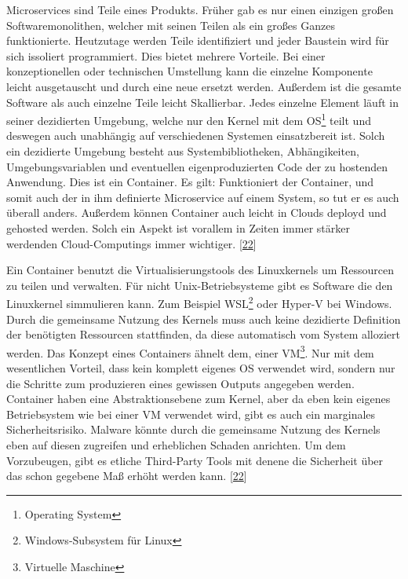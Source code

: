 \documentclass[
    headings=optiontotocandhead,%
    twoside,
    numbers=noenddot,%
    12pt, %
    titlepage, %
    parskip=full, %
    listof=leveldown, 
    numbers=noenddot, %
    a4paper,DIV=14,
    BCOR=15mm,
]{scrbook}
\begin{document}
Microservices sind Teile eines Produkts. Früher gab es nur einen
einzigen großen Softwaremonolithen, welcher mit seinen Teilen als ein
großes Ganzes funktionierte. Heutzutage werden Teile identifiziert und
jeder Baustein wird für sich issoliert programmiert. Dies bietet mehrere
Vorteile. Bei einer konzeptionellen oder technischen Umstellung kann die
einzelne Komponente leicht ausgetauscht und durch eine neue ersetzt
werden. Außerdem ist die gesamte Software als auch einzelne Teile leicht
Skallierbar. Jedes einzelne Element läuft in seiner dezidierten
Umgebung, welche nur den Kernel mit dem OS\footnote{Operating System}
teilt und deswegen auch unabhängig auf verschiedenen Systemen
einsatzbereit ist. Solch ein dezidierte Umgebung besteht aus
Systembibliotheken, Abhängikeiten, Umgebungsvariablen und eventuellen
eigenproduzierten Code der zu hostenden Anwendung. Dies ist ein
Container. Es gilt: Funktioniert der Container, und somit auch der in
ihm definierte Microservice auf einem System, so tut er es auch überall
anders. Außerdem können Container auch leicht in Clouds deployd und
gehosted werden. Solch ein Aspekt ist vorallem in Zeiten immer stärker
werdenden Cloud-Computings immer wichtiger.
{[}\protect\hyperlink{ref-ibm-docker}{22}{]}

Ein Container benutzt die Virtualisierungstools des Linuxkernels um
Ressourcen zu teilen und verwalten. Für nicht Unix-Betriebsysteme gibt
es Software die den Linuxkernel simmulieren kann. Zum Beispiel
WSL\footnote{Windows-Subsystem für Linux} oder Hyper-V bei Windows.
Durch die gemeinsame Nutzung des Kernels muss auch keine dezidierte
Definition der benötigten Ressourcen stattfinden, da diese automatisch
vom System alloziert werden. Das Konzept eines Containers ähnelt dem,
einer VM\footnote{Virtuelle Maschine}. Nur mit dem wesentlichen Vorteil,
dass kein komplett eigenes OS verwendet wird, sondern nur die Schritte
zum produzieren eines gewissen Outputs angegeben werden. Container haben
eine Abstraktionsebene zum Kernel, aber da eben kein eigenes
Betriebsystem wie bei einer VM verwendet wird, gibt es auch ein
marginales Sicherheitsrisiko. Malware könnte durch die gemeinsame
Nutzung des Kernels eben auf diesen zugreifen und erheblichen Schaden
anrichten. Um dem Vorzubeugen, gibt es etliche Third-Party Tools mit
denene die Sicherheit über das schon gegebene Maß erhöht werden kann.
{[}\protect\hyperlink{ref-ibm-docker}{22}{]}
\end{document}
